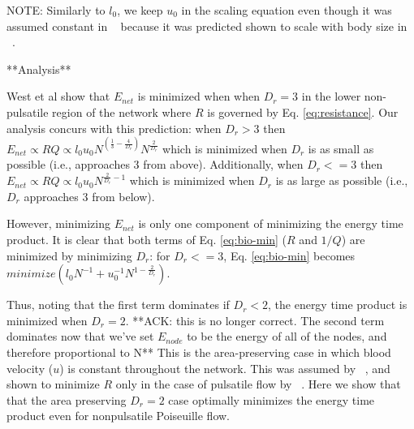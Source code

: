 \documentclass[12pt]{article}
\begin{document}
NOTE: Similarly to $l_0$, we keep $u_0$ in the scaling equation even though it was assumed constant in ~\cite{west97} because it was predicted shown to scale with body size in ~\cite{banavar10}. 



%
%
%
%




**Analysis**

West et al \cite{west97} show that $E_{net}$ is minimized when when $D_r = 3$ in the lower non-pulsatile region of the network where $R$ is governed by Eq. \ref {eq:resistance}. Our analysis concurs with this prediction: when $D_r > 3$ then $E_{net} \propto RQ \propto l_0 u_0 N^{(\frac{1}{3} - \frac{4}{D_r})}  N^{\frac{2}{D_r}}$ which is minimized when $D_r$ is as small as possible (i.e., approaches 3 from above). Additionally, when $D_r <= 3$  then $E_{net} \propto RQ \propto l_0 u_0  N^{\frac{2}{D_r}-1}$ which is minimized when $D_r$ is as large as possible (i.e., $D_r$ approaches 3 from below).

However, minimizing $E_{net}$ is only one component of minimizing the energy time product. It is clear that both terms of Eq. \ref{eq:bio-min} ($R$ and $1/Q$) are minimized by minimizing $D_r$: for $D_r < = 3$, Eq. \ref{eq:bio-min} becomes $minimize (l_0 N^{-1} + u_0^{-1} N^{1 - \frac{2}{D_r}})$. 


Thus, noting that the first term dominates if $D_r < 2$, the energy time product is minimized when $D_r  =2$. **ACK: this is no longer correct. The second term dominates now that we've set $E_{node}$ to be the energy of all of the nodes, and therefore proportional to N** This is the area-preserving case in which blood velocity ($u$) is constant throughout the network. This was assumed by ~\cite{banavar10}, and shown to minimize $R$ only in the case of pulsatile flow by ~\cite{west97}. Here we show that that the area preserving $D_r = 2$ case optimally minimizes the energy time product even for nonpulsatile Poiseuille flow. 
\end{document}
